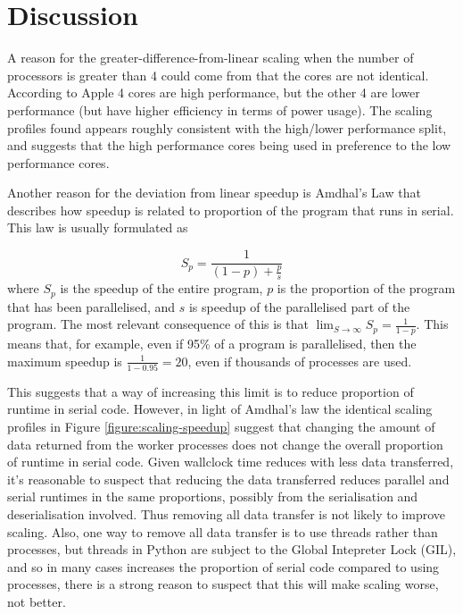 \documentclass[logo,msc,dsti]{style/infthesis}    %
\begin{document}
{\section{Discussion}

A reason for the greater-difference-from-linear scaling when the number of processors is greater than 4 could come from that the cores are not identical. According to Apple \cite{AppleM1Overview} 4 cores are high performance, but the other 4 are lower performance (but have higher efficiency in terms of power usage). The scaling profiles found appears roughly consistent with the high/lower performance split, and suggests that the high performance cores being used in preference to the low performance cores.

Another reason for the deviation from linear speedup is Amdhal's Law that describes how speedup is related to proportion of the program that runs in serial. This law is usually formulated as

\begin{equation}
S_p = \frac{1}{(1-p) + \frac{p}{s}}
\end{equation}
%
where $S_p$ is the speedup of the entire program, $p$ is the proportion of the program that has been parallelised, and $s$ is speedup of the parallelised part of the program. The most relevant consequence of this is that $\lim_{S\to\infty} S_p = \frac{1}{1-p}$. This means that, for example, even if 95\% of a program is parallelised, then the maximum speedup is $\frac{1}{1-0.95}=20$, even if thousands of processes are used.

This suggests that a way of increasing this limit is to reduce proportion of runtime in serial code. However, in light of Amdhal's law the identical scaling profiles in Figure \ref{figure:scaling-speedup} suggest that changing the amount of data returned from the worker processes does not change the overall proportion of runtime in serial code. Given wallclock time reduces with less data transferred, it's reasonable to suspect that reducing the data transferred reduces parallel and serial runtimes in the same proportions, possibly from the serialisation and deserialisation involved. Thus removing all data transfer is not likely to improve scaling. Also, one way to remove all data transfer is to use threads rather than processes, but threads in Python are subject to the Global Intepreter Lock (GIL), and so in many cases increases the proportion of serial code compared to using processes, there is a strong reason to suspect that this will make scaling worse, not better.

}
\end{document}
